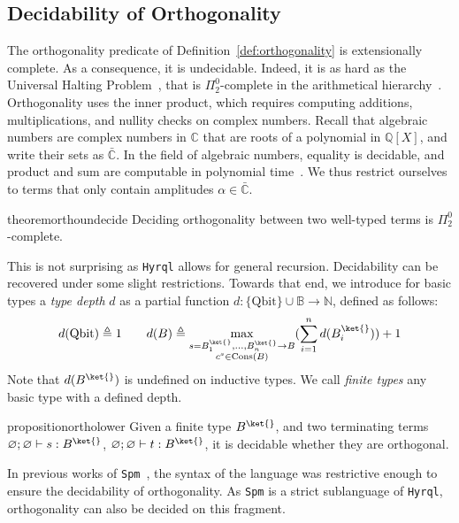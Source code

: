 \documentclass[10pt,a4paper]{article}
\newcommand{\bvar}{B}
\newcommand\bkvar{\bvar^{\ket{}}}
\newcommand{\qbit}{\mathrm{Qbit}}
\newcommand{\bset}{\mathbb{B}}
\newcommand{\cons}[1]{\mathrm{Cons}(#1)}
\newcommand{\sign}[2]{\ifx&#1&
  \else
  #1 \to
  \fi
#2}
\newcommand{\typing}[4]{
  \ifx&#1&\varnothing \else #1\fi; 
  \ifx&#2&\varnothing \else #2\fi 
  \vdash {#3} : #4
}
\newcommand{\closedtyping}[2]{\typing{}{}{#1}{#2}}
\newcommand{\pitwo}{\Pi_2^0}
\newcommand{\hyrql}{{{\tt{Hyrql}}}}
\newcommand{\spm}{{{\tt{Spm}}}}
\begin{document}
\subsection{Decidability of Orthogonality}
\label{subsec:orthogonality}
The orthogonality predicate of Definition~\ref{def:orthogonality} is
extensionally complete. As a consequence, it is undecidable.
Indeed, it is as hard as the Universal Halting Problem~\cite{EGZ09}, that is
$\Pi^0_2$-complete in the arithmetical hierarchy~\cite{Nie09}.
Orthogonality uses the inner product, which requires computing
additions, multiplications, and nullity checks on complex numbers. Recall that
algebraic numbers are complex numbers in $\mathbb C$ that are roots of a
polynomial in $\mathbb Q[X]$, and write their sets as $\bar{\mathbb C}$. In the
field of algebraic numbers, equality is decidable, and product and sum are
computable in polynomial time~\cite{HHK05}. We thus restrict ourselves to terms
that only contain amplitudes $\alpha \in \bar{\mathbb C}$.

\begin{restatable}{theorem}{orthoundecide}
  \label{thm:orthogonality-undecidable}
  Deciding orthogonality between two well-typed terms is $\pitwo$-complete.
\end{restatable}

This is not surprising as \hyrql{} allows for
general recursion. Decidability can be recovered under some slight restrictions.
Towards that end, we introduce for basic types
a \emph{type depth} $d$ as a partial function $d: \{\qbit \}\cup\bset \to
\mathbb N $, defined as follows:
\[
  d(\qbit) \triangleq 1 \qquad
  d(B) \triangleq \max_{\substack{{ s = \sign{\bkvar_1, \dots, \bkvar_n}
  \bvar} \\ c^s \in \cons B}}
  (\sum_{i=1}^n d(\bkvar_i)) + 1
\]
Note that $d(\bkvar)$ is undefined on inductive types.
We call \emph{finite types} any basic type with a defined depth.

\begin{restatable}{proposition}{ortholower}
  \label{prop:orthogonality-lower}
  Given a finite type $\bkvar$, and two terminating terms $\closedtyping s
  \bkvar$, $\closedtyping t \bkvar$, it is decidable whether they are
  orthogonal.
\end{restatable}

In previous works of \spm~\cite{CSV23, CLV24},
the syntax of the language was restrictive enough to ensure the decidability of
orthogonality. As \spm{} is a strict sublanguage of {\hyrql}, orthogonality
can also be decided on this fragment.
\end{document}
